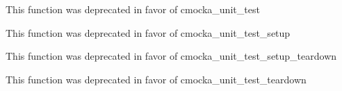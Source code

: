 \begin{DoxyRefList}
%
This function was deprecated in favor of cmocka\+\_\+unit\+\_\+test  
\item[Global \doxylink{group__cmocka__exec_gaf005639a9b71cced47ce4708e53912d9}{unit\+\_\+test\+\_\+setup} (test, setup)]\label{deprecated__deprecated000002}%
%
This function was deprecated in favor of cmocka\+\_\+unit\+\_\+test\+\_\+setup  
\item[Global \doxylink{group__cmocka__exec_gaee80106db018434c00df4ba235415b26}{unit\+\_\+test\+\_\+setup\+\_\+teardown} (test, setup, teardown)]\label{deprecated__deprecated000006}%
%
This function was deprecated in favor of cmocka\+\_\+unit\+\_\+test\+\_\+setup\+\_\+teardown  
\item[Global \doxylink{group__cmocka__exec_ga3fe0f3c69fb85843701876937b7217f4}{unit\+\_\+test\+\_\+teardown} (test, teardown)]\label{deprecated__deprecated000003}%
%
This function was deprecated in favor of cmocka\+\_\+unit\+\_\+test\+\_\+teardown 
\end{DoxyRefList}
